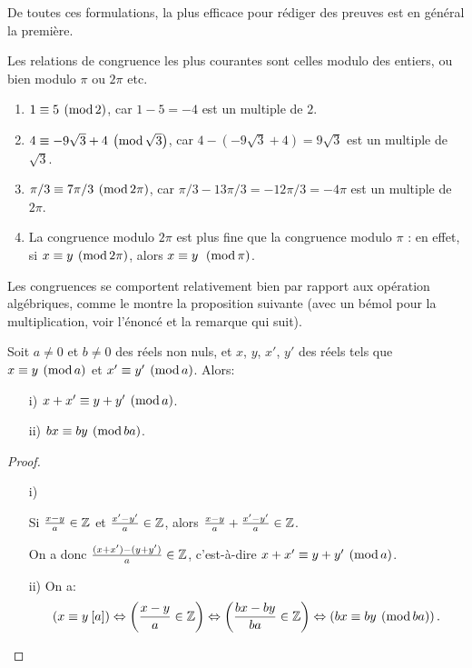 De toutes ces formulations, la plus efficace pour rédiger des preuves est en général la première.

Les relations de congruence les plus courantes sont celles modulo des entiers, ou bien modulo $\pi$ ou $2\pi$ etc.


\begin{exemples}
\begin{enumerate}[label=\alph*)]
\item $1 \equiv 5 \:\left(\operatorname{mod}2\right)$, car $1-5 = -4$ est un multiple de $2$.
\item $4\equiv -9\sqrt{3}+4 \:\left(\operatorname{mod}\sqrt{3}\right)$, car $4 - (-9\sqrt{3}+4) = 9\sqrt{3}$ est un multiple de $\sqrt{3}$.
\item $\pi/3 \equiv 7\pi/3 \:\left(\operatorname{mod}2\pi\right)$, car $\pi/3 - 13\pi/3 = -12\pi/3 = -4\pi$ est un multiple de $2\pi$.
\item La congruence modulo $2\pi$ est plus fine que la congruence modulo $\pi$ : en effet, si $x\equiv y \:\left(\operatorname{mod}2\pi\right)$, alors $x\equiv y\: \:\left(\operatorname{mod}\pi\right)$.
\end{enumerate}
\end{exemples}

Les congruences se comportent relativement bien par rapport aux opération algébriques, comme le montre la proposition suivante (avec un bémol pour la multiplication, voir l'énoncé et la remarque qui suit).

\begin{proposition} Soit $a\neq 0$ et $b\neq 0$ des réels non nuls, et $x$, $y$, $x'$, $y'$ des réels tels que $x \equiv y\:\left(\operatorname{mod}a\right)$ et $x' \equiv y'\:\left(\operatorname{mod}a\right)$. Alors:
\begin{itemize}
\item[i)]{$x+x' \equiv y+y'\:\left(\operatorname{mod}a\right)$.}
\item[ii)]{$bx\equiv by \:\left(\operatorname{mod}ba\right)$.}
\end{itemize}
\end{proposition}
\begin{proof}
\begin{itemize}
\item[i)]{Si $\frac{x-y}{a} \in \mathbb{Z}$ et $\frac{x'-y'}{a} \in \mathbb{Z}$, alors $\frac{x-y}{a}+\frac{x'-y'}{a} \in \mathbb{Z}$.

On a donc $\frac{(x+x')-(y+y')}{a} \in \mathbb{Z}$, c'est-à-dire $x+x' \equiv y+y'\:\left(\operatorname{mod}a\right)$.}
\item[ii)]{On a:
\[\left(x\equiv y \: [a]\right) \Leftrightarrow  \left(\frac{x-y}{a} \in \mathbb{Z}\right) \Leftrightarrow \left(\frac{bx-by}{ba} \in \mathbb{Z}\right) \Leftrightarrow \left(bx\equiv by \:\left(\operatorname{mod}ba\right)\right).\]}
\end{itemize}
\end{proof}

